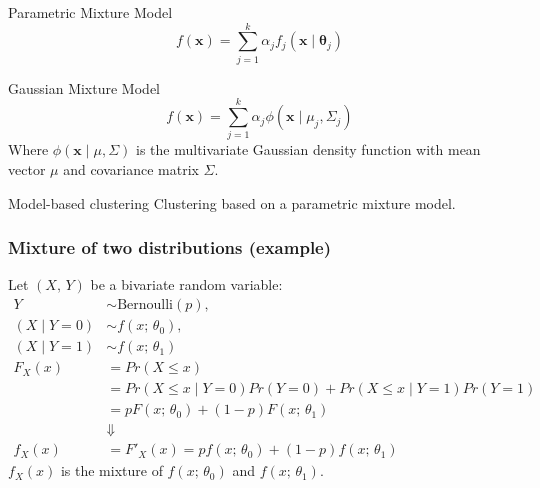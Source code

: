 \begin{definition}{Parametric Mixture Model}{}
	\begin{equation*}
		f(\boldsymbol{x}) = \sum_{j=1}^k \alpha_j f_j(\boldsymbol{x}\mid\boldsymbol{\theta}_j)
	\end{equation*}
\end{definition}

\begin{example}{Gaussian Mixture Model}{}
	\begin{equation*}
		f(\boldsymbol{x}) = \sum_{j=1}^k \alpha_j \phi(\boldsymbol{x}\mid \mu_j, \Sigma_j)
	\end{equation*}
	Where $\phi(\boldsymbol{x}\mid \mu, \Sigma)$ is the multivariate Gaussian density function
	with mean vector $\mu$ and covariance matrix $\Sigma$.
\end{example}

\begin{definition}{Model-based clustering}{}
	Clustering based on a parametric mixture model.
\end{definition}

\subsubsection{Mixture of two distributions (example)}

Let $(X,\,Y)$ be a bivariate random variable:
\begin{align*}
	Y               & \sim \text{Bernoulli}(p),                                               \\
	( X \mid Y = 0) & \sim f(x;\,\theta_0),                                                   \\
	( X \mid Y = 1) & \sim f(x;\,\theta_1)                                                    \\[0.5em]
	F_X(x)          & = Pr(X \leq x)                                                          \\
	                & = Pr(X \leq x \mid Y = 0) Pr(Y = 0) + Pr(X \leq x \mid Y = 1) Pr(Y = 1) \\
	                & = p F(x;\,\theta_0) + (1-p) F(x;\,\theta_1)                             \\
	                & \Downarrow                                                              \\
	f_X(x)          & = F'_X(x) = p f(x;\,\theta_0) + (1-p) f(x;\,\theta_1)
\end{align*}
$f_X(x)$ is the mixture of $f(x;\,\theta_0)$ and $f(x;\,\theta_1)$.


